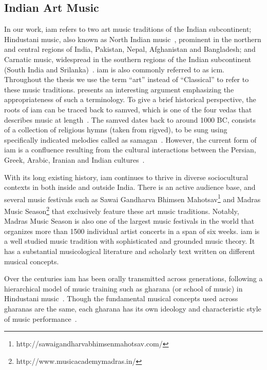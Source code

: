 \subsection{Indian Art Music}
\label{sec:music_background_iam}

In our work, \acrfull{iam} refers to two art music traditions of the Indian subcontinent; Hindustani music, also known as North Indian music~\citep{Bor2010, Danielou2010}, prominent in the northern and central regions of India, Pakistan, Nepal, Afghanistan and Bangladesh; and Carnatic music, widespread in the southern regions of the Indian subcontinent (South India and Srilanka)~\citep{Singh1995,Viswanathan2004}. \gls{iam} is also commonly referred to as \gls{icm}. Throughout the thesis we use the term ``art'' instead of ``Classical'' to refer to these music traditions. \cite[p. 1]{Raja2012} presents an interesting argument emphasizing the appropriateness of such a terminology. To give a brief historical perspective, the roots of \gls{iam} can be traced back to \gls{samved}, which is one of the four \gls{vedas} that describes music at length~\citep{Trivedi2008,Singh1995}. The \gls{samved} dates back to around 1000 BC, consists of a collection of religious hymns (taken from \gls{rigved}), to be sung using specifically indicated melodies called as \gls{samagan}~\citep{Griffith2004}. However, the current form of \gls{iam} is a confluence resulting from the cultural interactions between the Persian, Greek, Arabic, Iranian and Indian cultures~\citep{Kaul2007,Saraf2011,Singh1995}.

With its long existing history, \gls{iam} continues to thrive in diverse sociocultural contexts in both inside and outside India. There is an active audience base, and several music festivals such as Sawai Gandharva Bhimsen Mahotsav\footnote{http://sawaigandharvabhimsenmahotsav.com/} and Madras Music Season\footnote{http://www.musicacademymadras.in/} that exclusively feature these art music traditions. Notably, Madras Music Season is also one of the largest music festivals in the world that organizes more than 1500 individual artist concerts in a span of six weeks. \Gls{iam} is a well studied music tradition with sophisticated and grounded music theory. It has a substantial musicological literature and scholarly text written on different musical concepts. 

Over the centuries \gls{iam} has been orally transmitted across generations, following a hierarchical model of music training such as \gls{gharana} (or school of music) in Hindustani music~\citep{Saraf2011,Mehta2008}. Though the fundamental musical concepts used across \glspl{gharana} are the same, each \gls{gharana} has its own ideology and characteristic style of music performance~\citep{Deshpande1989}. 

